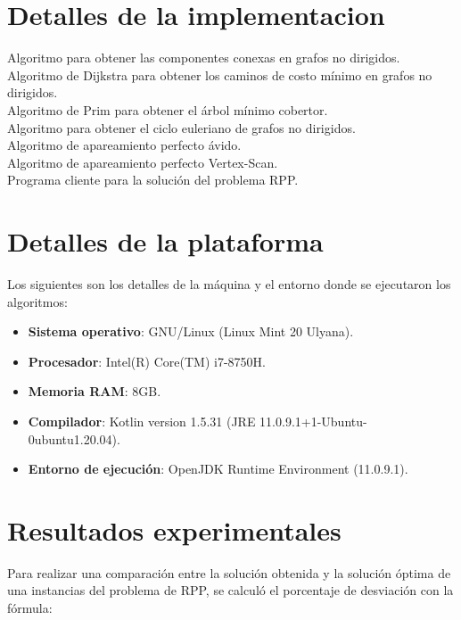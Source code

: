 \documentclass[11pt]{article}
\begin{document}
\section{Detalles de la implementacion}

Algoritmo para obtener las componentes conexas en grafos no dirigidos. \\

Algoritmo de Dijkstra para obtener los caminos de costo mínimo en grafos no dirigidos. \\

Algoritmo de Prim para obtener el árbol mínimo cobertor.\\

Algoritmo para obtener el ciclo euleriano de grafos no dirigidos.\\

Algoritmo de apareamiento perfecto ávido.\\

Algoritmo de apareamiento perfecto Vertex-Scan.\\

Programa cliente para la solución del problema RPP.\\


\section{Detalles de la plataforma}
Los siguientes son los detalles de la máquina y el entorno donde se ejecutaron los algoritmos:

\begin{itemize}
   \item \textbf{Sistema operativo}: GNU/Linux (Linux Mint 20 Ulyana).
   \item \textbf{Procesador}: Intel(R) Core(TM) i7-8750H.
   \item \textbf{Memoria RAM}: 8GB.
   \item \textbf{Compilador}: Kotlin version 1.5.31 (JRE 11.0.9.1+1-Ubuntu-0ubuntu1.20.04).
   \item \textbf{Entorno de ejecución}: OpenJDK Runtime Environment (11.0.9.1).
\end{itemize}

\section{Resultados experimentales}

Para realizar una comparación entre la solución obtenida y la solución óptima de una instancias
del problema de RPP, se calculó el porcentaje de desviación con la fórmula:
\end{document}
